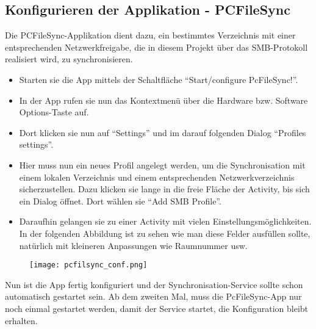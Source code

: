 \begin{flushleft}
  \subsection{Konfigurieren der Applikation - PCFileSync}
  Die PCFileSync-Applikation dient dazu, ein bestimmtes Verzeichnis mit einer entsprechenden Netzwerkfreigabe, die in diesem Projekt über das SMB-Protokoll realisiert wird, zu synchronisieren.
    \begin{itemize}
      \item Starten sie die App mittels der Schaltfläche ``Start/configure PcFileSync!''.
      \item In der App rufen sie nun das Kontextmenü über die Hardware bzw. Software Options-Taste auf.
      \item Dort klicken sie nun auf ``Settings'' und im darauf folgenden Dialog ``Profiles settings''.
      \item Hier muss nun ein neues Profil angelegt werden, um die Synchronisation mit einem lokalen Verzeichnis und einem entsprechenden Netzwerkverzeichnis sicherzustellen. Dazu klicken sie lange in die freie Fläche der Activity, bis sich ein Dialog öffnet. Dort wählen sie ``Add SMB Profile''.
      \item Daraufhin gelangen sie zu einer Activity mit vielen Einstellungsmöglichkeiten. In der folgenden Abbildung ist zu sehen wie man diese Felder ausfüllen sollte, natürlich mit kleineren Anpassungen wie Raumnummer usw.
      \end{itemize}
      \begin{figure}[htb]
        \centering
        \texttt{[image: pcfilsync\_conf.png]}\\ %
      \end{figure}
      Nun ist die App fertig konfiguriert und der Synchronisation-Service sollte schon automatisch gestartet sein.
      Ab dem zweiten Mal, muss die PcFileSync-App nur noch einmal gestartet werden, damit der Service startet, die Konfiguration bleibt erhalten.    

\end{flushleft}
